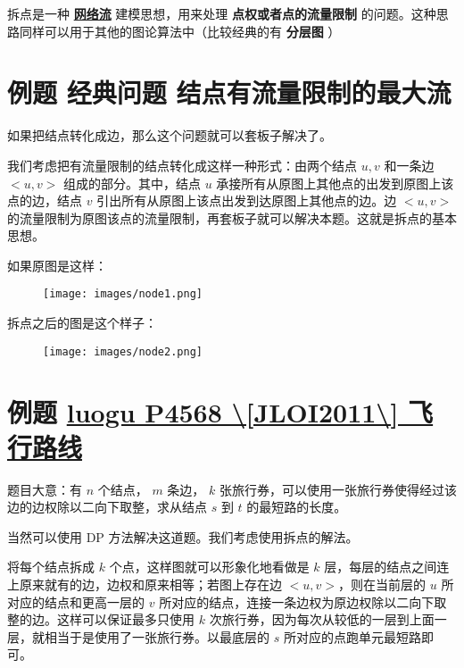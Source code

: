 
拆点是一种 \textbf{\href{/graph/flow/}{网络流}} 建模思想，用来处理 \textbf{点权或者点的流量限制} 的问题。这种思路同样可以用于其他的图论算法中（比较经典的有 \textbf{分层图} ）

\section{例题 经典问题 结点有流量限制的最大流}

如果把结点转化成边，那么这个问题就可以套板子解决了。

我们考虑把有流量限制的结点转化成这样一种形式：由两个结点 $u,v$ 和一条边 $<u,v>$ 组成的部分。其中，结点 $u$ 承接所有从原图上其他点的出发到原图上该点的边，结点 $v$ 引出所有从原图上该点出发到达原图上其他点的边。边 $<u,v>$ 的流量限制为原图该点的流量限制，再套板子就可以解决本题。这就是拆点的基本思想。

如果原图是这样：

\begin{figure}[h]
\centering
\texttt{[image: images/node1.png]} 

\end{figure}

拆点之后的图是这个样子：

\begin{figure}[h]
\centering
\texttt{[image: images/node2.png]} 

\end{figure}

\section{例题 \href{https://www.luogu.org/problemnew/show/P4568}{luogu P4568 \textbackslash{}[JLOI2011\textbackslash{}] 飞行路线}}

题目大意：有 $n$ 个结点， $m$ 条边， $k$ 张旅行券，可以使用一张旅行券使得经过该边的边权除以二向下取整，求从结点 $s$ 到 $t$ 的最短路的长度。

当然可以使用 DP 方法解决这道题。我们考虑使用拆点的解法。

将每个结点拆成 $k$ 个点，这样图就可以形象化地看做是 $k$ 层，每层的结点之间连上原来就有的边，边权和原来相等；若图上存在边 $<u,v>$，则在当前层的 $u$ 所对应的结点和更高一层的 $v$ 所对应的结点，连接一条边权为原边权除以二向下取整的边。这样可以保证最多只使用 $k$ 次旅行券，因为每次从较低的一层到上面一层，就相当于是使用了一张旅行券。以最底层的 $s$ 所对应的点跑单元最短路即可。
